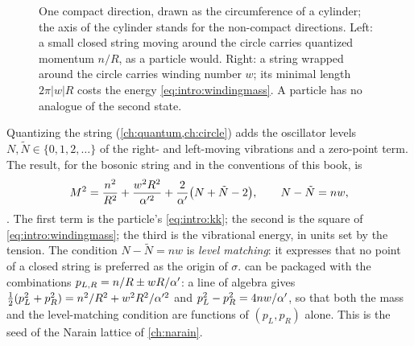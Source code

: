 \begin{figure}[t]
\centering
{}
\caption{One compact direction, drawn as the circumference of a cylinder; the axis of the
cylinder stands for the non-compact directions. Left: a small closed string moving around
the circle carries quantized momentum $n/R$, as a particle would. Right: a string wrapped
around the circle carries winding number $w$; its minimal length $2\pi|w|R$ costs the energy
\eqref{eq:intro:windingmass}. A particle has no analogue of the second state.}
\label{fig:intro:cylinder}
\end{figure}

Quantizing the string (\cref{ch:quantum,ch:circle}) adds the oscillator levels $N,\tilde N\in
\{0,1,2,\dots\}$ of the right- and left-moving vibrations and a zero-point term. The result,
for the bosonic string and in the conventions of this book, is
\begin{equation}\label{eq:intro:mass}
  M^2=\frac{n^2}{R^2}+\frac{w^2R^2}{\alpha'^2}+\frac{2}{\alpha'}\big(N+\tilde N-2\big),
  \qquad N-\tilde N=nw ,
\end{equation}
. The first term is the
particle's \eqref{eq:intro:kk}; the second is the square of \eqref{eq:intro:windingmass}; the
third is the vibrational energy, in units set by the tension. The condition $N-\tilde N=nw$ is
\emph{level matching}: it expresses that no point of a closed string is
preferred as the origin of $\sigma$.  can be packaged with the
combinations $p_{L,R}=n/R\pm wR/\alpha'$: a line of algebra gives
$\tfrac12(p_L^2+p_R^2)=n^2/R^2+w^2R^2/\alpha'^2$ and $p_L^2-p_R^2=4nw/\alpha'$, so that both the mass
and the level-matching condition are functions of $(p_L,p_R)$ alone. This is the seed of the
Narain lattice of \cref{ch:narain}.

